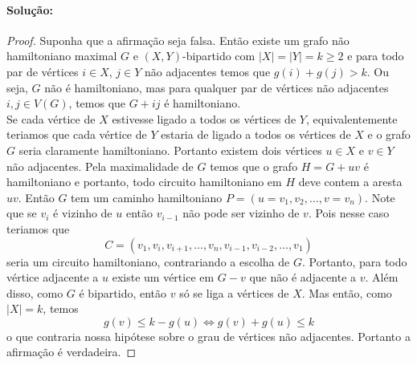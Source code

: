 \documentclass[11pt,a4paper,notitlepage]{exam}
\begin{document}
\paragraph{Solução: }
\begin{proof}
  Suponha que a afirmação seja falsa. Então existe um grafo não hamiltoniano maximal $G$ e $(X,Y)$-bipartido com $|X| = |Y| = k \geq 2$ e para todo par de vértices $i \in X$, $j \in Y$ não adjacentes temos que $g(i) + g(j) > k$. Ou seja, $G$ não é hamiltoniano, mas para qualquer par de vértices não adjacentes $i,j \in V(G)$, temos que $G + ij$ é hamiltoniano.\\
  Se cada vértice de $X$ estivesse ligado a todos os vértices de $Y$, equivalentemente teriamos que cada vértice de $Y$ estaria de ligado a todos os vértices de $X$ e o grafo $G$ seria claramente hamiltoniano. Portanto existem dois vértices $u \in X$ e $v \in Y$ não adjacentes. Pela maximalidade de $G$ temos que o grafo $H = G + uv$ é hamiltoniano e portanto, todo circuito hamiltoniano em $H$ deve contem a aresta $uv$. Então $G$ tem um caminho hamiltoniano $P = (u=v_1, v_2, \dots, v=v_n)$.
  Note que se $v_i$ é vizinho de $u$ então $v_{i-1}$ não pode ser vizinho de $v$. Pois nesse caso teriamos que
  $$
    C = (v_1,v_i,v_{i+1},\dots, v_n,  v_{i-1}, v_{i-2}, \dots, v_1)
  $$
  seria um circuito hamiltoniano, contrariando a escolha de $G$. Portanto, para todo vértice adjacente a $u$ existe um vértice em $G - v$ que não é adjacente a $v$. Além disso, como $G$ é bipartido, então $v$ só se liga a vértices de $X$. Mas então, como $|X| = k$, temos
  $$
    g(v) \leq k - g(u) \iff g(v) + g(u) \leq k
  $$
  o que contraria nossa hipótese sobre o grau de vértices não adjacentes. Portanto a afirmação é verdadeira.
\end{proof}
\end{document}
